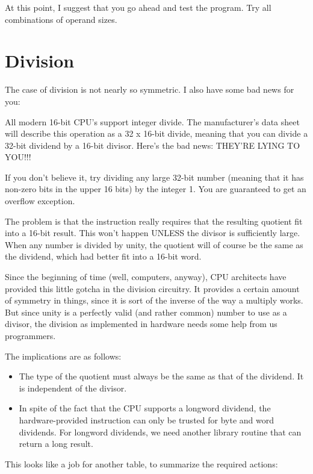 At this point, I suggest that you go ahead and test  the program. Try all combinations of operand sizes.

\section{Division}

The case of division is not nearly so  symmetric. I  also have some bad news for you:

All  modern  16-bit   CPU's   support   integer   divide. The manufacturer's data  sheet  will  describe  this  operation  as a 32 x 16-bit divide, meaning that you can divide a 32-bit dividend by a 16-bit divisor. Here's the bad news:
THEY'RE LYING TO YOU!!!

If you don't believe  it, try  dividing  any large 32-bit number (meaning that it has non-zero bits  in  the upper 16 bits) by the integer 1. You are guaranteed to get an overflow exception.

The  problem is that the instruction  really  requires  that  the resulting quotient fit into a 16-bit result. This  won't happen UNLESS the divisor is  sufficiently  large. When any number is divided by unity, the quotient will of course be the same  as the dividend, which had better fit into a 16-bit word.

Since  the  beginning  of  time  (well, computers, anyway), CPU architects have  provided  this  little  gotcha  in  the division circuitry. It provides a certain amount of  symmetry  in things, since it is sort of the inverse of the way a multiply works. But since  unity  is  a perfectly valid (and rather common) number to use as a divisor, the division as implemented  in  hardware needs some help from us programmers.

The implications are as follows:

\begin{itemize}
\item	The type of the quotient must always be the same as  that of the dividend. It is independent of the divisor.
\item	In spite of  the  fact  that  the  CPU  supports  a longword dividend, the hardware-provided  instruction  can  only  be trusted  for  byte  and  word  dividends. For  longword dividends, we need another library routine that can return a long result.
\end{itemize}

This  looks  like  a job for  another  table, to  summarize  the required actions:

